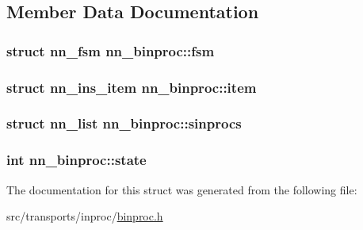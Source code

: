 \subsection{Member Data Documentation}
\subsubsection[{fsm}]{\setlength{\rightskip}{0pt plus 5cm}struct {\bf nn\+\_\+fsm} nn\+\_\+binproc\+::fsm}\hypertarget{structnn__binproc_ad152292e85dd03c76b5a04bf1b1c2312}{}\label{structnn__binproc_ad152292e85dd03c76b5a04bf1b1c2312}
\subsubsection[{item}]{\setlength{\rightskip}{0pt plus 5cm}struct {\bf nn\+\_\+ins\+\_\+item} nn\+\_\+binproc\+::item}\hypertarget{structnn__binproc_a83a82b2df7063407e75ee23708b7bbe1}{}\label{structnn__binproc_a83a82b2df7063407e75ee23708b7bbe1}
\subsubsection[{sinprocs}]{\setlength{\rightskip}{0pt plus 5cm}struct {\bf nn\+\_\+list} nn\+\_\+binproc\+::sinprocs}\hypertarget{structnn__binproc_aafb4a9584de9f07138980df5521d06a2}{}\label{structnn__binproc_aafb4a9584de9f07138980df5521d06a2}
\subsubsection[{state}]{\setlength{\rightskip}{0pt plus 5cm}int nn\+\_\+binproc\+::state}\hypertarget{structnn__binproc_a4a221bbc12129b2ce30068c90154f798}{}\label{structnn__binproc_a4a221bbc12129b2ce30068c90154f798}


The documentation for this struct was generated from the following file\+:\begin{DoxyCompactItemize}
\item 
src/transports/inproc/\hyperlink{binproc_8h}{binproc.\+h}\end{DoxyCompactItemize}
